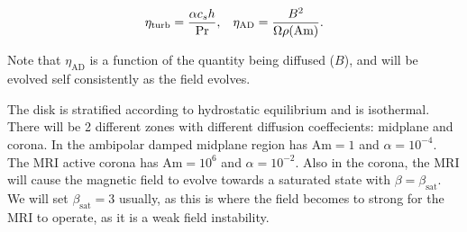 \begin{equation}
\eta_{\text{turb}} = \frac{\alpha c_s h}{\text{Pr}}, \hspace{3mm} 
\eta_{\text{AD}}   = \frac{B^2}{\Omega \rho (\text{Am})}.                   
\end{equation}

\noindent Note that $\eta_{\text{AD}}$ is a function of the quantity being diffused ($B$), and will be evolved self consistently as the field evolves.  

The disk is stratified according to hydrostatic equilibrium and is isothermal. There will be 2 different zones with different diffusion coeffecients: midplane and corona.  In the ambipolar damped midplane region has $\text{Am}=1$ and $\alpha=10^{-4}$.  The MRI active corona has $\text{Am}=10^6$ and $\alpha=10^{-2}$.  Also in the corona, the MRI will cause the magnetic field to evolve towards a saturated state with $\beta=\beta_\text{sat}$.  We will set $\beta_\text{sat}=3$ usually, as this is where the field becomes to strong for the MRI to operate, as it is a weak field instability. 




















